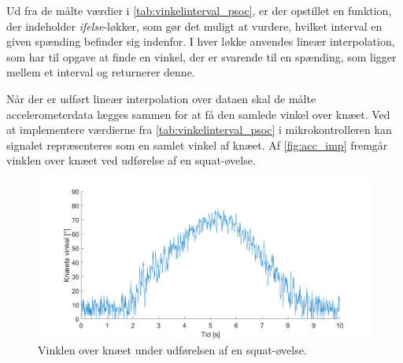 \noindent
Ud fra de målte værdier i \autoref{tab:vinkelinterval_psoc}, er der opstillet en funktion, der indeholder \textit{ifelse}-løkker, som gør det muligt at vurdere, hvilket interval en given spænding befinder sig indenfor. 
I hver løkke anvendes lineær interpolation, som har til opgave at finde en vinkel, der er svarende til en spænding, som ligger mellem et interval og returnerer denne. 

Når der er udført lineær interpolation over dataen skal de målte accelerometerdata lægges sammen for at få den samlede vinkel over knæet. 
Ved at implementere værdierne fra \autoref{tab:vinkelinterval_psoc} i mikrokontrolleren kan signalet repræsenteres som en samlet vinkel af knæet. Af \autoref{fig:acc_imp} fremgår vinklen over knæet ved udførelse af en squat-øvelse.
 

\begin{figure}[H]
\centering
\includegraphics[width=1\textwidth]{figures/Pilotforsoeg/accvinkel}
\caption{Vinklen over knæet under udførelsen af en squat-øvelse.}
\label{fig:acc_imp}
\end{figure}



